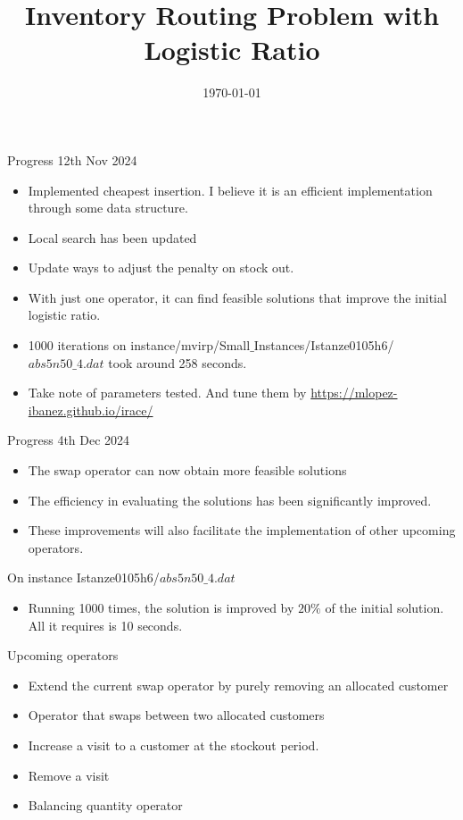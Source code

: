 \documentclass{beamer}
\title{Inventory Routing Problem with Logistic Ratio}
\date{\today}
\begin{document}
\begin{frame}{Progress 12th Nov 2024}

\begin{itemize}
    \item Implemented cheapest insertion. I believe it is an efficient implementation through some data structure.
    \item Local search has been updated
    \item Update ways to adjust the penalty on stock out.
    \item With just one operator, it can find feasible solutions that improve the initial logistic ratio. 
    \item 1000 iterations on instance/mvirp/Small$\_$Instances/Istanze0105h6/$abs5n50\_4.dat$ took around 258 seconds.

    
    \item Take note of parameters tested. And tune them by \url{https://mlopez-ibanez.github.io/irace/}
    
 
\end{itemize}
    
\end{frame}


\begin{frame}{Progress 4th Dec 2024}

\begin{itemize}
    \item The swap operator can now obtain more feasible solutions 
    \item The efficiency in evaluating the solutions has been significantly improved.
    \item These improvements will also facilitate the implementation of other upcoming operators.
\end{itemize}
On instance Istanze0105h6/$abs5n50\_4.dat$
\begin{itemize}
    \item Running 1000 times, the solution is improved by $20\%$ of the initial solution. All it requires is 10 seconds. 
\end{itemize}
Upcoming operators
\begin{itemize}
    \item Extend the current swap operator by purely removing an allocated customer
    \item Operator that swaps between two allocated customers
    \item Increase a visit to a customer at the stockout period.
    \item Remove a visit
    \item Balancing quantity operator
\end{itemize}
\end{frame}
\end{document}
